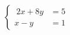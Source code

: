 \documentclass[preview]{standalone}
\begin{document}
\begin{align*}
\left\{ \begin{array}{cl} \ 2x + 8y & = 5 \\[1pt] x - y & = 1 \end{array} \right.
\end{align*}
\end{document}
